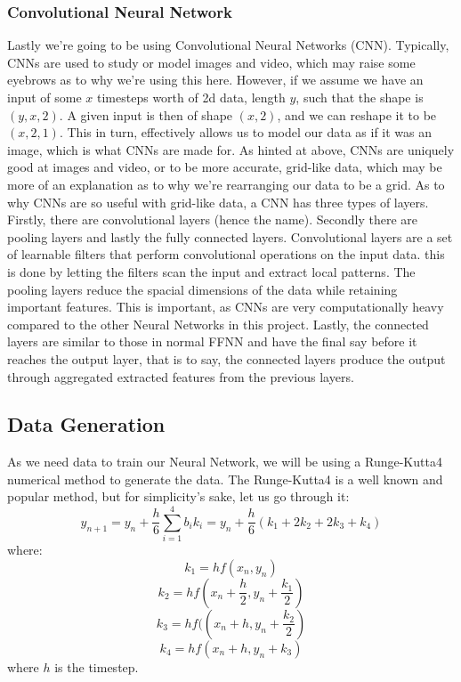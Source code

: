\documentclass{article}
\begin{document}
\subsubsection{Convolutional Neural Network}
Lastly we're going to be using Convolutional Neural Networks (CNN). Typically, CNNs are used to study or model images and video, which may raise some eyebrows as to why we're using this here. However, if we assume we have an input of some $x$ timesteps worth of 2d data, length $y$, such that the shape is $(y, x, 2)$. A given input is then of shape $(x,2)$, and we can reshape it to be $(x, 2, 1)$. This in turn, effectively allows us to model our data as if it was an image, which is what CNNs are made for.
\newline
As hinted at above, CNNs are uniquely good at images and video, or to be more accurate, grid-like data, which may be more of an explanation as to why we're rearranging our data to be a grid. As to why CNNs are so useful with grid-like data, a CNN has three types of layers. Firstly, there are convolutional layers (hence the name). Secondly there are pooling layers and lastly the fully connected layers. Convolutional layers are a set of learnable filters that perform convolutional operations on the input data. this is done by letting the filters scan the input and extract local patterns. The pooling layers reduce the spacial dimensions of the data while retaining important features. This is important, as CNNs are very computationally heavy compared to the other Neural Networks in this project. Lastly, the connected layers are similar to those in normal FFNN and have the final say before it reaches the output layer, that is to say, the connected layers produce the output through aggregated extracted features from the previous layers. \newpage
\subsection{Data Generation}
As we need data to train our Neural Network, we will be using a Runge-Kutta4 numerical method to generate the data. The Runge-Kutta4 is a well known and popular method, but for simplicity's sake, let us go through it:
\begin{equation}
    y_{n+1} = y_n + \frac{h}{6} \sum_{i=1}^4 b_i k_i = y_n + \frac{h}{6} \left(k_1 + 2k_2 + 2k_3 + k_4\right)
\end{equation}
where:
\begin{equation*}
    k_1 = h f(x_n, y_n)
\end{equation*}
\begin{equation*}
    k_2 = h f\left(x_n + \frac{h}{2}, y_n + \frac{k_1}{2}\right)
\end{equation*}
\begin{equation*}
    k_3 = hf(\left(x_n + h, y_n + \frac{k_2}{2}\right)
\end{equation*}
\begin{equation*}
    k_4 = hf(x_n + h, y_n + k_3)
\end{equation*}
where $h$ is the timestep.
\end{document}
